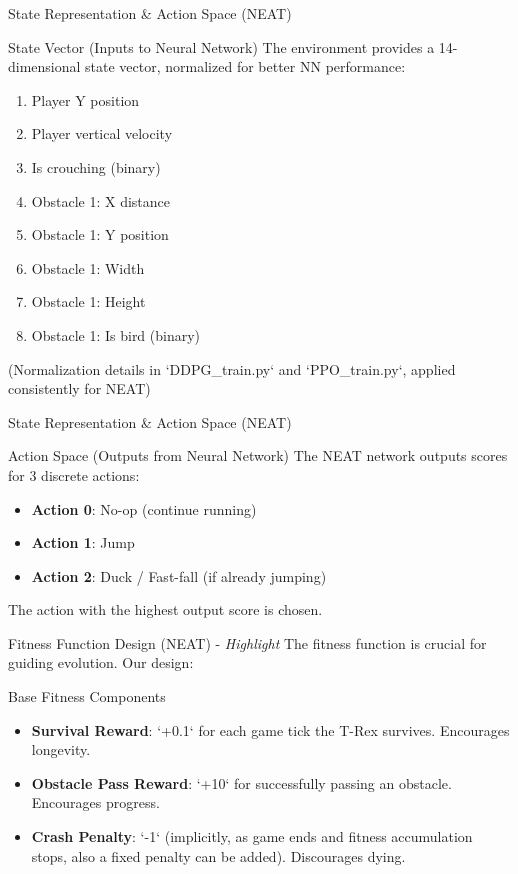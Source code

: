 \documentclass{beamer}
\begin{document}
\begin{frame}{State Representation \& Action Space (NEAT)}
  \begin{block}{State Vector (Inputs to Neural Network)}
    The environment provides a 14-dimensional state vector, normalized for better NN performance:
    \begin{enumerate}
        \item Player Y position
        \item Player vertical velocity
        \item Is crouching (binary)
        \item Obstacle 1: X distance
        \item Obstacle 1: Y position
        \item Obstacle 1: Width
        \item Obstacle 1: Height
        \item Obstacle 1: Is bird (binary)
    \end{enumerate}
    \tiny (Normalization details in `DDPG\_train.py` and `PPO\_train.py`, applied consistently for NEAT)
  \end{block}
\end{frame}

\begin{frame}{State Representation \& Action Space (NEAT)}
  \begin{block}{Action Space (Outputs from Neural Network)}
    The NEAT network outputs scores for 3 discrete actions:
    \begin{itemize}
        \item \textbf{Action 0}: No-op (continue running)
        \item \textbf{Action 1}: Jump
        \item \textbf{Action 2}: Duck / Fast-fall (if already jumping)
    \end{itemize}
    The action with the highest output score is chosen.
  \end{block}
\end{frame}

\begin{frame}{Fitness Function Design (NEAT) - \textit{Highlight}}
  The fitness function is crucial for guiding evolution. Our design:
  \begin{block}{Base Fitness Components}
    \begin{itemize}
        \item \textbf{Survival Reward}: `+0.1` for each game tick the T-Rex survives. Encourages longevity.
        \item \textbf{Obstacle Pass Reward}: `+10` for successfully passing an obstacle. Encourages progress.
        \item \textbf{Crash Penalty}: `-1` (implicitly, as game ends and fitness accumulation stops, also a fixed penalty can be added). Discourages dying.
    \end{itemize}
  \end{block}
\end{frame}
\end{document}
